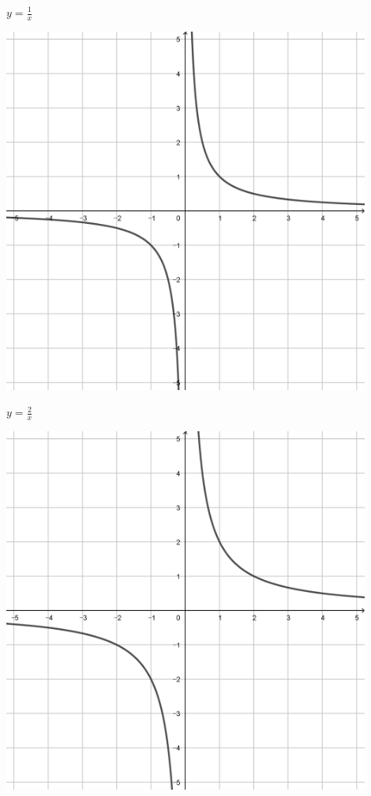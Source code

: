 \documentclass[a4paper]{oblivoir}
\begin{document}
\clearpage
\begin{minipage}{0.45\textwidth}\centering
\(y=\frac1x\)
\par\bigskip\includegraphics[width=0.9\textwidth]{img/4_rational_1}
\end{minipage}
\begin{minipage}{0.45\textwidth}\centering
\(y=\frac2x\)
\par\bigskip\includegraphics[width=0.9\textwidth]{img/4_rational_2}
\end{minipage}\bigskip\bigskip\par
\end{document}
